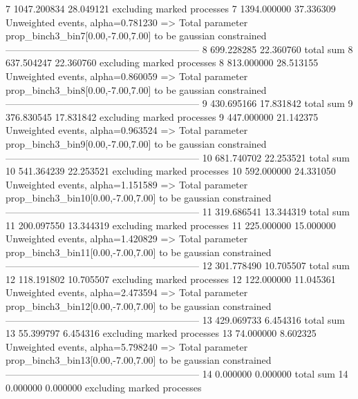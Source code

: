 7          1047.200834     28.049121       excluding marked processes    
7          1394.000000     37.336309       Unweighted events, alpha=0.781230
  => Total parameter prop_binch3_bin7[0.00,-7.00,7.00] to be gaussian constrained
------------------------------------------------------------
8          699.228285      22.360760       total sum                     
8          637.504247      22.360760       excluding marked processes    
8          813.000000      28.513155       Unweighted events, alpha=0.860059
  => Total parameter prop_binch3_bin8[0.00,-7.00,7.00] to be gaussian constrained
------------------------------------------------------------
9          430.695166      17.831842       total sum                     
9          376.830545      17.831842       excluding marked processes    
9          447.000000      21.142375       Unweighted events, alpha=0.963524
  => Total parameter prop_binch3_bin9[0.00,-7.00,7.00] to be gaussian constrained
------------------------------------------------------------
10         681.740702      22.253521       total sum                     
10         541.364239      22.253521       excluding marked processes    
10         592.000000      24.331050       Unweighted events, alpha=1.151589
  => Total parameter prop_binch3_bin10[0.00,-7.00,7.00] to be gaussian constrained
------------------------------------------------------------
11         319.686541      13.344319       total sum                     
11         200.097550      13.344319       excluding marked processes    
11         225.000000      15.000000       Unweighted events, alpha=1.420829
  => Total parameter prop_binch3_bin11[0.00,-7.00,7.00] to be gaussian constrained
------------------------------------------------------------
12         301.778490      10.705507       total sum                     
12         118.191802      10.705507       excluding marked processes    
12         122.000000      11.045361       Unweighted events, alpha=2.473594
  => Total parameter prop_binch3_bin12[0.00,-7.00,7.00] to be gaussian constrained
------------------------------------------------------------
13         429.069733      6.454316        total sum                     
13         55.399797       6.454316        excluding marked processes    
13         74.000000       8.602325        Unweighted events, alpha=5.798240
  => Total parameter prop_binch3_bin13[0.00,-7.00,7.00] to be gaussian constrained
------------------------------------------------------------
14         0.000000        0.000000        total sum                     
14         0.000000        0.000000        excluding marked processes    
